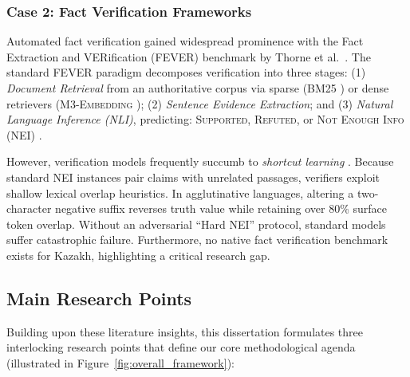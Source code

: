 \subsubsection{Case 2: Fact Verification Frameworks}
\label{sec:case2_fact_verification}

Automated fact verification gained widespread prominence with the Fact Extraction and VERification (FEVER) benchmark by Thorne et al.\ \cite{thorne2018fever}. The standard FEVER paradigm decomposes verification into three stages: (1) \textit{Document Retrieval} from an authoritative corpus via sparse (BM25 \cite{robertson2009bm25}) or dense retrievers (\textsc{M3-Embedding} \cite{chen-etal-2024-m3}); (2) \textit{Sentence Evidence Extraction}; and (3) \textit{Natural Language Inference (NLI)}, predicting: \textsc{Supported}, \textsc{Refuted}, or \textsc{Not Enough Info} (NEI) \cite{wang-etal-2024-factcheck-bench}.

However, verification models frequently succumb to \textit{shortcut learning} \cite{wang-etal-2024-factcheck-bench}. Because standard \textsc{NEI} instances pair claims with unrelated passages, verifiers exploit shallow lexical overlap heuristics. In agglutinative languages, altering a two-character negative suffix reverses truth value while retaining over 80\% surface token overlap. Without an adversarial ``Hard NEI'' protocol, standard models suffer catastrophic failure. Furthermore, no native fact verification benchmark exists for Kazakh, highlighting a critical research gap.

\subsection{Main Research Points}
\label{sec:main_research_points}

Building upon these literature insights, this dissertation formulates three interlocking research points that define our core methodological agenda (illustrated in Figure~\ref{fig:overall_framework}):

